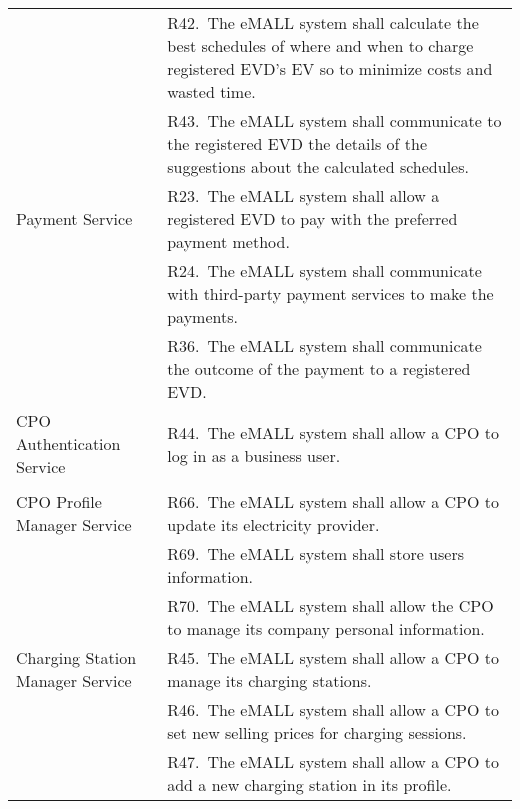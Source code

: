\begin{center}
\begin{longtable}{p{0.3\linewidth}p{0.7\linewidth}}
        & R42.\ The eMALL system shall calculate the best schedules of where and when to charge registered EVD’s EV so to minimize costs and wasted time. \\
        & R43.\ The eMALL system shall communicate to the registered EVD the details of the suggestions about the calculated schedules.                   \\
        \hline
        Payment Service                        & R23.\ The eMALL system shall allow a registered EVD to pay with the preferred payment method.                                                   \\
        & R24.\ The eMALL system shall communicate with third-party payment services to make the payments.                                                \\
        & R36.\ The eMALL system shall communicate the outcome of the payment to a registered EVD.                                                        \\
        \hline
        CPO Authentication Service             & R44.\ The eMALL system shall allow a CPO to log in as a business user.                                                                          \\
        &                                                                                                                                                 \\
        \hline
        CPO Profile Manager Service            & R66.\ The eMALL system shall allow a CPO to update its electricity provider.                                                                    \\
        & R69.\ The eMALL system shall store users information.                                                                                           \\
        & R70.\ The eMALL system shall allow the CPO to manage its company personal information.                                                          \\
        \hline
        Charging Station Manager Service       & R45.\ The eMALL system shall allow a CPO to manage its charging stations.                                                                       \\
        & R46.\ The eMALL system shall allow a CPO to set new selling prices for charging sessions.                                                       \\
        & R47.\ The eMALL system shall allow a CPO to add a new charging station in its profile.                                                          \\

\end{longtable}
\end{center}
